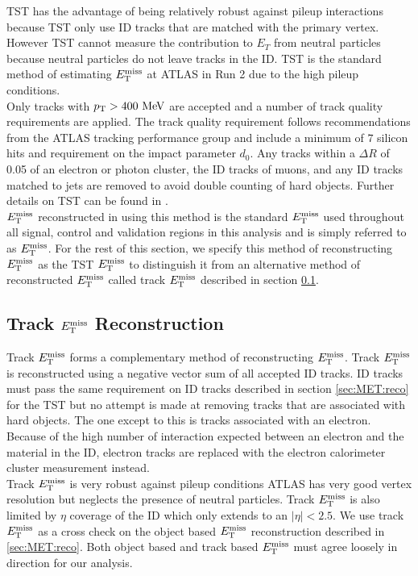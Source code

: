 \indent TST has the advantage of being relatively robust against pileup interactions because TST only use ID tracks that are matched with the primary vertex. However TST cannot measure the contribution to $E_T$ from neutral particles because neutral particles do not leave tracks in the ID.  TST is the standard method of estimating $E_{\mathrm{T}}^{\mathrm{miss}}$  at ATLAS in Run 2 due to the high pileup conditions. \\

\indent  Only tracks with $\pt > 400 \mev$ are accepted and a number of track quality requirements are applied.  The track quality requirement follows recommendations from the ATLAS tracking performance group and include a minimum of $7$ silicon hits and requirement on the impact parameter $d_0$. Any tracks within a $\Delta R$ of 0.05 of an electron or photon cluster, the ID tracks of muons, and any ID tracks matched to jets are removed to avoid double counting of hard objects.  Further details on TST can be found in \cite{METReco}.  \\

\indent $E_{\mathrm{T}}^{\mathrm{miss}}$ reconstructed in using this method is the standard $E_{\mathrm{T}}^{\mathrm{miss}}$ used throughout all signal, control and validation regions in this analysis and is simply referred to as $E_{\mathrm{T}}^{\mathrm{miss}}$.  For the rest of this section, we specify this method of reconstructing $E_{\mathrm{T}}^{\mathrm{miss}}$ as the TST $E_{\mathrm{T}}^{\mathrm{miss}}$ to distinguish it from an alternative method of reconstructed $E_{\mathrm{T}}^{\mathrm{miss}}$ called track $E_{\mathrm{T}}^{\mathrm{miss}}$ described in section \ref{sec:reco:trkMET}. \\

\subsection{Track $E_{\mathrm{T}}^{\mathrm{miss}}$ Reconstruction}
\label{sec:reco:trkMET}

\indent Track $E_{\mathrm{T}}^{\mathrm{miss}}$ forms a complementary method of reconstructing $E_{\mathrm{T}}^{\mathrm{miss}}$.  Track $E_{\mathrm{T}}^{\mathrm{miss}}$ is reconstructed using a negative vector sum of all accepted ID tracks.  ID tracks must pass the same requirement on ID tracks described in section \ref{sec:MET:reco} for the TST but no attempt is made at removing tracks that are associated with hard objects.  The one except to this is tracks associated with an electron.  Because of the high number of interaction expected between an electron and the material in the ID, electron tracks are replaced with the electron calorimeter cluster measurement instead.  \\

\indent Track $E_{\mathrm{T}}^{\mathrm{miss}}$ is very robust against pileup conditions ATLAS has very good vertex resolution but neglects the presence of neutral particles.  Track $E_{\mathrm{T}}^{\mathrm{miss}}$ is also limited by $\eta$ coverage of the ID which only extends to an $|\eta| < 2.5$.  We use track $E_{\mathrm{T}}^{\mathrm{miss}}$ as a cross check on the object based $E_{\mathrm{T}}^{\mathrm{miss}}$ reconstruction described in \ref{sec:MET:reco}. Both object based and track based $E_{\mathrm{T}}^{\mathrm{miss}}$ must agree loosely in direction for our analysis.  \\

